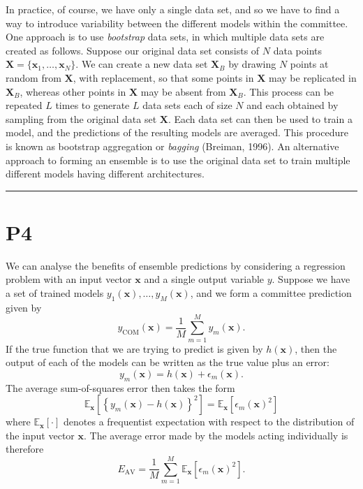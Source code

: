 \documentclass{article}
\begin{document}
In practice, of course, we have only a single data set, and so we have to find a way to introduce variability between the different models within the committee. One approach is to use \textit{bootstrap} data sets, in which multiple data sets are created as follows. Suppose our original data set consists of $N$ data points $\mathbf{X} = \{\mathbf{x}_1, \ldots, \mathbf{x}_N\}$. We can create a new data set $\mathbf{X}_B$ by drawing $N$ points at random from $\mathbf{X}$, with replacement, so that some points in $\mathbf{X}$ may be replicated in $\mathbf{X}_B$, whereas other points in $\mathbf{X}$ may be absent from $\mathbf{X}_B$. This process can be repeated $L$ times to generate $L$ data sets each of size $N$ and each obtained by sampling from the original data set $\mathbf{X}$. Each data set can then be used to train a model, and the predictions of the resulting models are averaged. This procedure is known as bootstrap aggregation or \textit{bagging} (Breiman, 1996). An alternative approach to forming an ensemble is to use the original data set to train multiple different models having different architectures.

\noindent\rule{\linewidth}{0.4pt}

\section{P4}

We can analyse the benefits of ensemble predictions by considering a regression problem with an input vector $\mathbf{x}$ and a single output variable $y$. Suppose we have a set of trained models $y_1(\mathbf{x}), \ldots, y_M(\mathbf{x})$, and we form a committee prediction given by
\begin{equation}
y_{\text{COM}}(\mathbf{x}) = \frac{1}{M} \sum_{m=1}^{M} y_m(\mathbf{x}).
\tag{9.43}
\end{equation}
If the true function that we are trying to predict is given by $h(\mathbf{x})$, then the output of each of the models can be written as the true value plus an error:
\begin{equation}
y_m(\mathbf{x}) = h(\mathbf{x}) + \epsilon_m(\mathbf{x}).
\tag{9.44}
\end{equation}
The average sum-of-squares error then takes the form
\begin{equation}
\mathbb{E}_{\mathbf{x}} \left[ \left\{ y_m(\mathbf{x}) - h(\mathbf{x}) \right\}^2 \right] = \mathbb{E}_{\mathbf{x}} \left[ \epsilon_m(\mathbf{x})^2 \right]
\tag{9.45}
\end{equation}
where $\mathbb{E}_{\mathbf{x}}[\cdot]$ denotes a frequentist expectation with respect to the distribution of the input vector $\mathbf{x}$. The average error made by the models acting individually is therefore
\begin{equation}
E_{\text{AV}} = \frac{1}{M} \sum_{m=1}^{M} \mathbb{E}_{\mathbf{x}} \left[ \epsilon_m(\mathbf{x})^2 \right].
\tag{9.46}
\end{equation}
\end{document}
